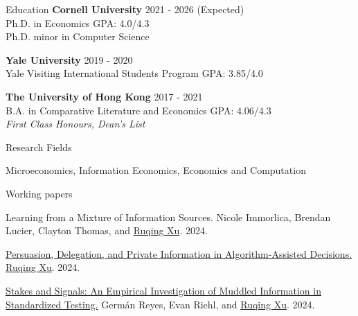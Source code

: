 \documentclass{resume} %
\begin{document}

\begin{rSection}{Education}
{\bf Cornell University} \hfill {2021 - 2026 (Expected)} 
\\ Ph.D. in Economics \hfill {GPA: 4.0/4.3} \\
Ph.D. minor in Computer Science \hfill

{\bf Yale University} \hfill {2019 - 2020} 
\\ Yale Visiting International Students Program \hfill {GPA: 3.85/4.0}

{\bf The University of Hong Kong} \hfill {2017 - 2021} 
\\ B.A. in Comparative Literature and Economics \hfill {GPA: 4.06/4.3}
\\ \emph{First Class Honours, Dean's List}

\end{rSection}

\begin{rSection}{Research Fields} \itemsep -10pt
\item Microeconomics, Information Economics, Economics and Computation
\end{rSection}

\begin{rSection}{Working papers}

Learning from a Mixture of Information Sources. Nicole Immorlica, Brendan Lucier, Clayton Thomas, and \underline{Ruqing Xu}. 2024.

\href{https://ruqing-xu.github.io/assets/pdf/delegation_xu.pdf}{Persuasion, Delegation, and Private Information in Algorithm-Assisted Decisions.} \underline{Ruqing Xu}. 2024.

\href{https://ruqing-xu.github.io/assets/pdf/rrx_stakes_june2024.pdf}{Stakes and Signals: An Empirical Investigation of Muddled
Information in Standardized Testing.} Germán Reyes, Evan Riehl, and \underline{Ruqing Xu}. 2024.



\end{rSection}
\end{document}
